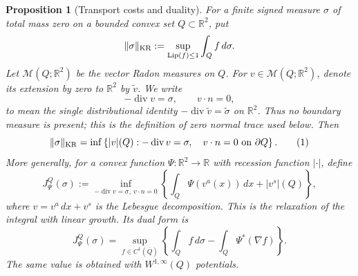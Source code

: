 \documentclass{aomart}
\newtheorem{proposition}[theorem]{Proposition}
\theoremstyle{definition}
\newcommand{\1}{\mathbf 1}
\begin{document}
\begin{proposition}[Transport costs and duality]\label{def:kr-beckmann}
For a finite signed measure $\sigma$ of total mass zero on a bounded convex
set $Q\subset\mathbb R^2$, put
\begin{equation*}
\|\sigma\|_ {\rm KR}
:=\sup_ {\operatorname {Lip}(f)\leq1}\int_ Q f\,d\sigma .
\end{equation*}
Let $\mathcal M(Q;\mathbb R^2)$ be the vector Radon measures on
$Q$.  For $v\in\mathcal M(Q;\mathbb R^2)$, denote its extension by
zero to $\mathbb R^2$ by $\widetilde v$.  We write
\begin{equation*}
-\operatorname {div}v=\sigma,\qquad v\cdot n=0,
\end{equation*}
to mean the single distributional identity
$-\operatorname {div}\widetilde v=\widetilde\sigma$ on
$\mathbb R^2$.  Thus no boundary measure is present; this is the
definition of zero normal trace used below.  Then
\begin{equation}
\|\sigma\|_ {\rm KR}
=\inf\left\{|v|(Q):
-\operatorname {div}v=\sigma,\quad v\cdot n=0\text{ on }\partial Q
\right\}.
\tag{1}
\end{equation}
More generally, for a convex function $\Psi:\mathbb R^2\to\mathbb R$
with recession function $|\cdot|$, define
\begin{equation*}
J^Q_ \Psi(\sigma)
:=\inf_ {-\operatorname {div}v=\sigma,\ v\cdot n=0}
\left\{\int_ Q\Psi(v^a(x))\,dx+|v^s|(Q)\right\},
\end{equation*}
where $v=v^a\,dx+v^s$ is the Lebesgue decomposition.  This is the
relaxation of the integral with linear growth.
Its dual form is
\begin{equation}
J^Q_ \Psi(\sigma)
=\sup_ {f\in C^1(\overline Q)}
\left\{\int_ Q f\,d\sigma-\int_ Q\Psi^*(\nabla f)\right\}.
\tag{2}
\end{equation}
The same value is obtained with $W^{1,\infty}(Q)$ potentials.

\end{proposition}
\end{document}
